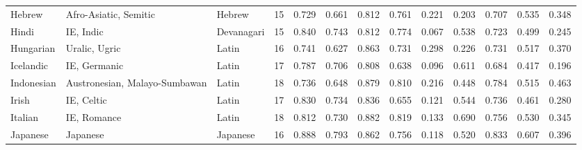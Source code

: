 \begin{tabular}{lllrrrrrrrrrr}
                         Hebrew &           Afro-Asiatic, Semitic &                Hebrew &        15 &                       0.729 &                         0.661 &         0.812 &                  0.761 &            0.221 &                         0.203 &         0.707 &                  0.535 &            0.348 \\
                          Hindi &                       IE, Indic &            Devanagari &        15 &                       0.840 &                         0.743 &         0.812 &                  0.774 &            0.067 &                         0.538 &         0.723 &                  0.499 &            0.245 \\
                      Hungarian &                   Uralic, Ugric &                 Latin &        16 &                       0.741 &                         0.627 &         0.863 &                  0.731 &            0.298 &                         0.226 &         0.731 &                  0.517 &            0.370 \\
                      Icelandic &                    IE, Germanic &                 Latin &        17 &                       0.787 &                         0.706 &         0.808 &                  0.638 &            0.096 &                         0.611 &         0.684 &                  0.417 &            0.196 \\
                     Indonesian &   Austronesian, Malayo-Sumbawan &                 Latin &        18 &                       0.736 &                         0.648 &         0.879 &                  0.810 &            0.216 &                         0.448 &         0.784 &                  0.515 &            0.463 \\
                          Irish &                      IE, Celtic &                 Latin &        17 &                       0.830 &                         0.734 &         0.836 &                  0.655 &            0.121 &                         0.544 &         0.736 &                  0.461 &            0.280 \\
                        Italian &                     IE, Romance &                 Latin &        18 &                       0.812 &                         0.730 &         0.882 &                  0.819 &            0.133 &                         0.690 &         0.756 &                  0.530 &            0.345 \\
                       Japanese &                        Japanese &              Japanese &        16 &                       0.888 &                         0.793 &         0.862 &                  0.756 &            0.118 &                         0.520 &         0.833 &                  0.607 &            0.396 \\

\end{tabular}
